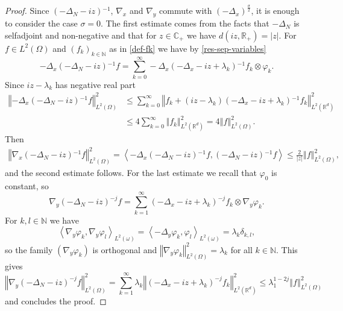 \documentclass[10pt, a4paper,reqno]{amsart}
\theoremstyle{plain}
\theoremstyle{definition}
\theoremstyle{remark}
\begin{document}
\begin{proof}
Since $(-{{\Delta}_N} -iz){^{-1}}$, $\nabla_x$ and $\nabla_y$ commute with $(-{\Delta}_x)^{\frac {\sigma} 2}$, it is enough to consider the case ${\sigma} = 0$. The first estimate comes from the facts that $-{{\Delta}_N}$ is selfadjoint and non-negative and that for $z \in {\mathbb{C}}_+$ we have $d(iz,{\mathbb{R}}_+) = {\left\vert z\right\vert}$. For $f\in L^2({\Omega})$ and ${\left({f}_{k}\right)_{k \in{\mathbb{N}}}}$ as in \eqref{def-fk} we have by \eqref{res-sep-variables}
\[
-{{\Delta}_x} (-{{\Delta}_N} -iz){^{-1}} f = \sum_{k = 0}^\infty -{{\Delta}_x} (-{{\Delta}_x} - iz + {\lambda}_k){^{-1}} f_k \otimes {\varphi}_k.
\]
Since $iz - {\lambda}_k$ has negative real part
\begin{align*}
{\left\Vert {-{{\Delta}_x} (-{{\Delta}_N} -iz){^{-1}} f}\right\Vert}_{L^2({\Omega})}^2
& {\leqslant} \sum_{k = 0}^\infty {\left\Vert {f_k + (iz-{\lambda}_k) (-{{\Delta}_x} - iz + {\lambda}_k){^{-1}} f_k}\right\Vert}_{L^2({\mathbb{R}}^d)}^2\\
& {\leqslant} 4 \sum_{k=0}^\infty {\left\Vert {f_k}\right\Vert}_{L^2({\mathbb{R}}^d)}^2 = 4 {\left\Vert {f}\right\Vert}_{L^2({\Omega})}^2.
\end{align*}
Then 
\begin{align*}
{\left\Vert {\nabla_x (-{{\Delta}_N} -iz){^{-1}} f}\right\Vert}_{L^2({\Omega})}^2 = {{\left< {-{{\Delta}_x} (-{{\Delta}_N} -iz){^{-1}} f} , {(-{{\Delta}_N} -iz){^{-1}} f} \right>}} {\leqslant} \frac 2 {{\left\vert z\right\vert}} {\left\Vert f\right\Vert}_{L^2({\Omega})}^2,
\end{align*}
and the second estimate follows.
For the last estimate we recall that ${\varphi}_0$ is constant, so 
\[
\nabla_y (-{{\Delta}_N} -iz)^{-j} f = \sum_{k = 1}^\infty  (-{{\Delta}_x} - iz + {\lambda}_k)^{-j} f_k \otimes \nabla_y {\varphi}_k.
\]
For $k,l \in {\mathbb{N}}$ we have
\[
{\left< {\nabla_y {\varphi}_k} , {\nabla_y {\varphi}_l} \right>}_{L^2({\omega})} = {\left< {-{\Delta}_y {\varphi}_k} , {{\varphi}_l} \right>}_{L^2({\omega})} = {\lambda}_k {\delta}_{k,l},
\]
so the family $(\nabla_y {\varphi}_k)$ is orthogonal and ${\left\Vert {\nabla_y {\varphi}_k}\right\Vert}_{L^2({\Omega})}^2 = {\lambda}_k$ for all $k \in {\mathbb{N}}$. This gives 
\[
{\left\Vert { \nabla_y (-{{\Delta}_N} -iz)^{-j} f}\right\Vert}_{L^2({\Omega})}^2 = \sum_{k=1}^\infty {\lambda}_k {\left\Vert {(-{{\Delta}_x} - iz + {\lambda}_k)^{-j} f_k}\right\Vert}_{L^2({\mathbb{R}}^d)}^2 {\leqslant} {\lambda}_1^{1-2j} {\left\Vert {f}\right\Vert}_{L^2({\Omega})}^2
\]
and concludes the proof.
\end{proof}
\end{document}
